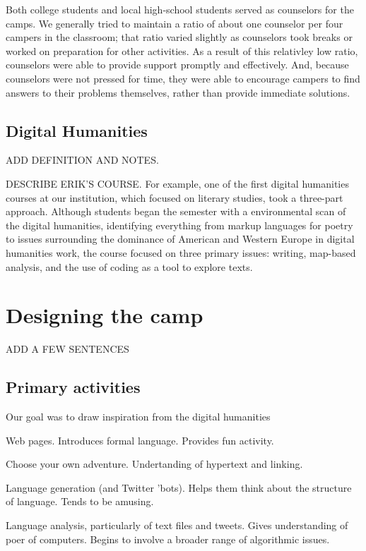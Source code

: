Both college students and local high-school students served as
counselors for the camps.  We generally tried to maintain a ratio
of about one counselor per four campers in the classroom; that ratio
varied slightly as counselors took breaks or worked on preparation
for other activities.  As a result of this relativley low ratio,
counselors were able to provide support promptly and effectively.
And, because counselors were not pressed for time, they were able
to encourage campers to find answers to their problems themselves,
rather than provide immediate solutions.

\subsection{Digital Humanities}

ADD DEFINITION AND NOTES.

DESCRIBE ERIK'S COURSE.  For example, one of the first digital humanities
courses at our institution, which focused on literary studies, took a
three-part approach.  Although students began the semester with a 
environmental scan of the digital humanities, identifying everything
from markup languages for poetry to issues surrounding the dominance
of American and Western Europe in digital humanities work, the course
focused on three primary issues: writing, map-based analysis, and the
use of coding as a tool to explore texts.

\section{Designing the camp}

ADD A FEW SENTENCES

\subsection{Primary activities}

Our goal was to draw inspiration from the digital humanities

Web pages.  Introduces formal language.  Provides fun activity.

Choose your own adventure.  Undertanding of hypertext and linking.

Language generation (and Twitter 'bots).  Helps them think about
the structure of language.  Tends to be amusing.

Language analysis, particularly of text files and tweets.  Gives
understanding of poer of computers.  Begins to involve a broader
range of algorithmic issues.

